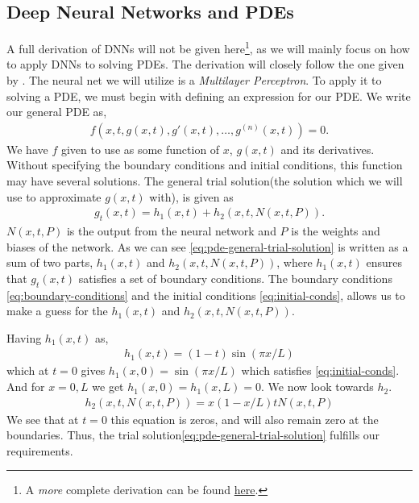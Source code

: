 \subsection{Deep Neural Networks and PDEs}
A full derivation of DNNs will not be given here\footnote{A \textit{more} complete derivation can be found \href{https://github.com/hmvege/StatML/blob/master/doc/backpropagation.pdf}{here}.}, as we will mainly focus on how to apply DNNs to solving PDEs. The derivation will closely follow the one given by \citet{hein-odenn}. The neural net we will utilize is a \textit{Multilayer Perceptron}. To apply it to solving a PDE, we must begin with defining an expression for our PDE. We write our general PDE as,
\begin{align}
    f\left( x, t, g(x, t), g'(x, t), \dots, g^{(n)}(x, t) \right) = 0.
    \label{eq:pde-general}
\end{align}
We have $f$ given to use as some function of $x$, $g(x, t)$ and its derivatives. Without specifying the boundary conditions and initial conditions, this function may have several solutions\cite{boas_mathematical_2006}. The general trial solution(the solution which we will use to approximate $g(x, t)$ with), is given as
\begin{align}
    g_t(x,t) = h_1(x,t) + h_2 (x, t, N(x, t, P)).
    \label{eq:pde-general-trial-solution}
\end{align}
$N(x, t, P)$ is the output from the neural network and $P$ is the weights and biases of the network. As we can see \eqref{eq:pde-general-trial-solution} is written as a sum of two parts, $h_1(x, t)$ and $h_2(x, t, N(x, t, P))$, where $h_1(x, t)$ ensures that $g_t(x, t)$ satisfies a set of boundary conditions\cite{lagaris_artificial_1998}. The boundary conditions \eqref{eq:boundary-conditions} and the initial conditions \eqref{eq:initial-conds}, allows us to make a guess for the $h_1(x, t)$ and $h_2(x, t, N(x, t, P))$.

Having $h_1(x, t)$ as,
\begin{align}
    h_1 (x, t) = (1 - t) \sin (\pi x / L)
    \label{eq:h1}
\end{align}
which at $t=0$ gives $h_1(x,0) = \sin(\pi x / L)$ which satisfies \eqref{eq:initial-conds}. And for $x=0, L$ we get $h_1(x,0)=h_1(x,L)=0$. We now look towards $h_2$.
\begin{align}
    h_2(x,t,N(x,t,P)) = x (1 - x/L)t N(x, t, P)
    \label{eq:h2}
\end{align}
We see that at $t=0$ this equation is zeros, and will also remain zero at the boundaries. Thus, the trial solution\eqref{eq:pde-general-trial-solution} fulfills our requirements.

